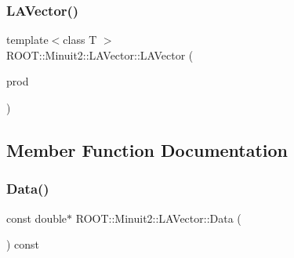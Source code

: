 \subsubsection{\texorpdfstring{LAVector()}{LAVector()}\hspace{0.1cm}{\footnotesize\ttfamily [16/16]}}
{\footnotesize\ttfamily template$<$class T $>$ \\
R\+O\+O\+T\+::\+Minuit2\+::\+L\+A\+Vector\+::\+L\+A\+Vector (\begin{DoxyParamCaption}\item[{const \mbox{\hyperlink{classROOT_1_1Minuit2_1_1ABObj}{A\+B\+Obj}}$<$ \mbox{\hyperlink{classROOT_1_1Minuit2_1_1vec}{vec}}, \mbox{\hyperlink{classROOT_1_1Minuit2_1_1ABSum}{A\+B\+Sum}}$<$ \mbox{\hyperlink{classROOT_1_1Minuit2_1_1ABObj}{A\+B\+Obj}}$<$ \mbox{\hyperlink{classROOT_1_1Minuit2_1_1vec}{vec}}, \mbox{\hyperlink{classROOT_1_1Minuit2_1_1ABProd}{A\+B\+Prod}}$<$ \mbox{\hyperlink{classROOT_1_1Minuit2_1_1ABObj}{A\+B\+Obj}}$<$ \mbox{\hyperlink{classROOT_1_1Minuit2_1_1sym}{sym}}, \mbox{\hyperlink{classROOT_1_1Minuit2_1_1LASymMatrix}{L\+A\+Sym\+Matrix}}, T $>$, \mbox{\hyperlink{classROOT_1_1Minuit2_1_1ABObj}{A\+B\+Obj}}$<$ \mbox{\hyperlink{classROOT_1_1Minuit2_1_1vec}{vec}}, \mbox{\hyperlink{classROOT_1_1Minuit2_1_1LAVector}{L\+A\+Vector}}, T $>$ $>$, T $>$, \mbox{\hyperlink{classROOT_1_1Minuit2_1_1ABObj}{A\+B\+Obj}}$<$ \mbox{\hyperlink{classROOT_1_1Minuit2_1_1vec}{vec}}, \mbox{\hyperlink{classROOT_1_1Minuit2_1_1LAVector}{L\+A\+Vector}}, T $>$ $>$, T $>$ \&}]{prod }\end{DoxyParamCaption})\hspace{0.3cm}{\ttfamily [inline]}}



\subsection{Member Function Documentation}
\mbox{\label{classROOT_1_1Minuit2_1_1LAVector_a22e21b176e4d63740045edb4c12fe0a3}} 
\subsubsection{\texorpdfstring{Data()}{Data()}\hspace{0.1cm}{\footnotesize\ttfamily [1/4]}}
{\footnotesize\ttfamily const double$\ast$ R\+O\+O\+T\+::\+Minuit2\+::\+L\+A\+Vector\+::\+Data (\begin{DoxyParamCaption}{ }\end{DoxyParamCaption}) const\hspace{0.3cm}{\ttfamily [inline]}}

